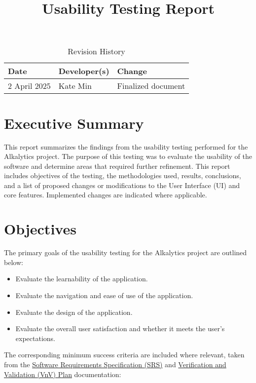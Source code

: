 \documentclass{article}
\title{Usability Testing Report\\\progname}
\author{\authname}
\date{}
\begin{document}
\maketitle

\newpage

\begin{table}[hp]
\caption{Revision History} \label{TblRevisionHistory}
\begin{tabularx}{\textwidth}{llX}
\toprule
\textbf{Date} & \textbf{Developer(s)} & \textbf{Change}\\
\midrule
2 April 2025 & Kate Min & Finalized document\\
\bottomrule
\end{tabularx}
\end{table}

\newpage

\tableofcontents

\newpage

\section{Executive Summary}
This report summarizes the findings from the usability testing performed for the
Alkalytics project. The purpose of this testing was to evaluate the usability of
the software and determine areas that required further refinement.
This report includes objectives of the testing, the methodologies used, results,
conclusions, and a list of proposed changes or modifications to the User
Interface (UI) and core features. Implemented changes are indicated where
applicable.

\section{Objectives}
The primary goals of the usability testing for the Alkalytics project are
outlined below:

\begin{itemize} 
    \item Evaluate the learnability of the application.
    \item Evaluate the navigation and ease of use of the application.
    \item Evaluate the design of the application.
    \item Evaluate the overall user satisfaction and whether it meets the user's
    expectations.
\end{itemize}

The corresponding minimum success criteria are included where relevant, taken
from the
\href{https://github.com/SumanyaG/Alkalytics/blob/main/docs/SRS/SRS.pdf}{Software
Requirements Specification (SRS)} and
\href{https://github.com/SumanyaG/Alkalytics/blob/main/docs/VnVPlan/VnVPlan.pdf}{Verification
and Validation (VnV) Plan} documentation:
\end{document}
